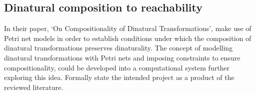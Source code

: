 \documentclass[../../Dissertation.tex]{subfiles}
\begin{document}
\subsection{Dinatural composition to reachability}
In their paper, `On Compositionality of Dinatural Transformations',  make use of Petri net models in order to establish conditions under which the composition of dinatural transformations preserves dinaturality. The concept of modelling dinatural transformations with Petri nets and imposing constraints to ensure compositionality, could be developed into a computational system further exploring this idea.
\newline\newline
Formally state the intended project as a product of the reviewed literature.
\end{document}
